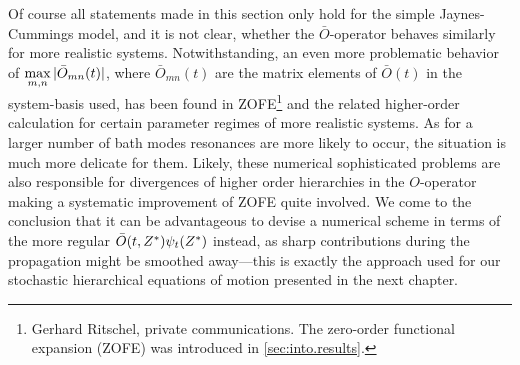 Of course all statements made in this section only hold for the simple Jaynes-Cummings model, and it is not clear, whether the $\bar O$-operator behaves similarly for more realistic systems.
Notwithstanding, an even more problematic behavior of $\max\limits_{m,n} \vert \bar O_{mn}(t) \vert$, where $\bar O_{mn}(t)$ are the matrix elements of $\bar O(t)$ in the system-basis used, has been found in \textsc{ZOFE}\footnote{%
  Gerhard Ritschel, private communications.
  The zero-order functional expansion (\textsc{ZOFE}) was introduced in \autoref{sec:into.results}.
}
and the related higher-order calculation for certain parameter regimes of more realistic systems.
As for a larger number of bath modes resonances are more likely to occur, the situation is much more delicate for them.
Likely, these numerical sophisticated problems are also responsible for divergences of higher order hierarchies in the $O$-operator making a systematic improvement of \textsc{ZOFE} quite involved.
We come to the conclusion that it can be advantageous to devise a numerical scheme in terms of the more regular $\bar O(t, \ZZ) \psitZ$ instead, as sharp contributions during the propagation might be smoothed away---this is exactly the approach used for our stochastic hierarchical equations of motion presented in the next chapter.
